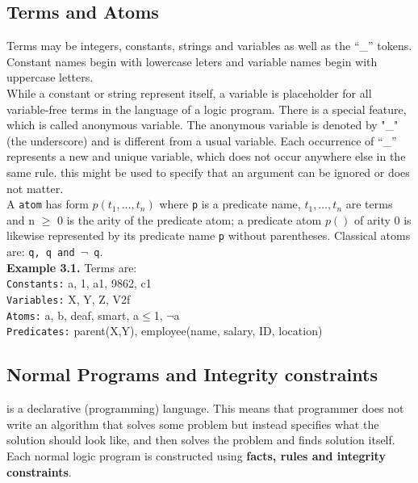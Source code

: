 \documentclass[14pt,a4paper, titlepage]{article}
\begin{document}
\subsection{Terms and Atoms}
Terms may be integers, constants, strings and variables as well as the \enquote{\_} tokens. Constant names begin with lowercase leters and variable names begin with uppercase letters. \\ While a constant or string represent itself, a variable is placeholder for all variable-free terms in the language of a logic program. There is a special feature, which is called anonymous variable. The anonymous variable is denoted by "\_" (the underscore) and is different from a usual variable. Each occurrence of \enquote{\_} represents a new and unique variable, which does not occur anywhere else in the same rule. this might be used to specify that an argument can be ignored or does not matter.
\\A \texttt{atom} has form \texttt{$p(t_1,\dots,t_n)$} where \texttt{p} is a predicate name, $t_1,\dots,t_n$ are terms and n $\geq$ 0 is the arity of the predicate atom; a predicate atom $p()$ of arity 0 is likewise represented by its predicate name \texttt{p} without parentheses. Classical atoms are: \texttt{q, q and $\neg$ q}.   
\\ \textbf{Example 3.1.} 
Terms are:
\\ \texttt{Constants:} a, 1, a1, 9862, c1
\\ \texttt{Variables:} X, Y, Z, V2f
\\ \texttt{Atoms:} a, b, deaf, smart, a$\leq$1, $\neg$a
\\ \texttt{Predicates:} parent(X,Y), employee(name, salary, ID, location)
       

\subsection{Normal Programs and Integrity constraints}
\dlvhex{} is a declarative (programming) language. This means that programmer does not write an algorithm that solves some problem but instead specifies what the solution should look like, and then solves the problem and finds solution itself. Each normal logic program is constructed using \textbf{facts, rules and integrity constraints}. 
\end{document}

